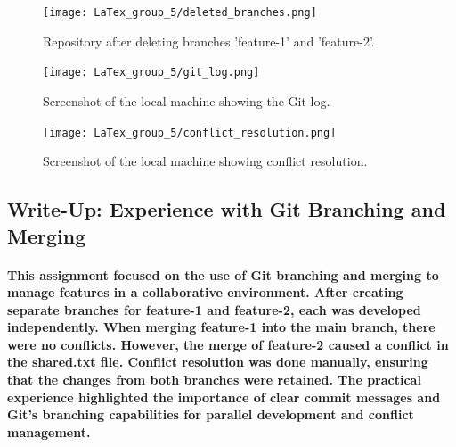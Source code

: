 \documentclass[12pt, a4paper]{article}
\begin{document}
\begin{figure}[h!]
    \centering
    \texttt{[image: LaTex\_group\_5/deleted\_branches.png]}
       \hspace{4 cm}
    \caption{Repository after deleting branches 'feature-1' and 'feature-2'.}
    \label{fig:enter-label}
\end{figure}
\hspace{6 cm}
\begin{figure}[h!]
    \centering
    \texttt{[image: LaTex\_group\_5/git\_log.png]} %
    \hspace{4 cm}
    \caption{Screenshot of the local machine showing the Git log.}
\end{figure}
\hspace{6 cm}
\begin{figure}[h!]
    \centering
    \texttt{[image: LaTex\_group\_5/conflict\_resolution.png]} %
       \hspace{4 cm}
    \caption{Screenshot of the local machine showing conflict resolution.}
\end{figure}
\newpage
{}
\vspace{-1.5cm}
\subsection*{\Huge{Write-Up: Experience with Git Branching and Merging}}
\hspace{1 cm}
\paragraph {This assignment focused on the use of Git branching and merging to manage features in a collaborative environment. After creating separate branches for feature-1 and feature-2, each was developed independently.
When merging feature-1 into the main branch, there were no conflicts. However, the merge of feature-2 caused a conflict in the shared.txt file. Conflict resolution was done manually, ensuring that the changes from both branches were retained.
The practical experience highlighted the importance of clear commit messages and Git’s branching capabilities for parallel development and conflict management.}
\end{document}
